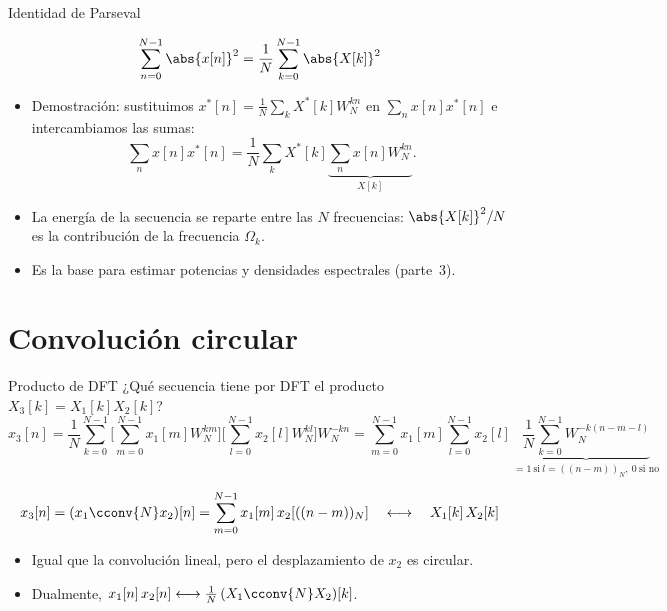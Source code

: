 \documentclass[aspectratio=169,11pt]{beamer}
\begin{document}
\begin{frame}{Identidad de Parseval}
  \begin{importante}
    \[
      \sum_{n=0}^{N-1}\abs{x[n]}^2=\frac{1}{N}\sum_{k=0}^{N-1}\abs{X[k]}^2
    \]
  \end{importante}
  \begin{itemize}
    \item Demostración: sustituimos $x^*[n]=\frac1N\sum_kX^*[k]W_N^{kn}$ en $\sum_nx[n]x^*[n]$ e intercambiamos las sumas:
    \[
      \sum_nx[n]x^*[n]=\frac1N\sum_kX^*[k]\underbrace{\sum_nx[n]W_N^{kn}}_{X[k]}.
    \]
    \item La energía de la secuencia se reparte entre las $N$ frecuencias: $\abs{X[k]}^2/N$ es la contribución de la frecuencia $\Omega_k$.
    \item Es la base para estimar potencias y densidades espectrales (parte~3).
  \end{itemize}
\end{frame}

\section{Convolución circular}

\begin{frame}{Producto de DFT}
  ¿Qué secuencia tiene por DFT el producto $X_3[k]=X_1[k]X_2[k]$?
  \[
    x_3[n]=\frac1N\sum_{k=0}^{N-1}\Big[\sum_{m=0}^{N-1}x_1[m]W_N^{km}\Big]\Big[\sum_{l=0}^{N-1}x_2[l]W_N^{kl}\Big]W_N^{-kn}
    =\sum_{m=0}^{N-1}x_1[m]\sum_{l=0}^{N-1}x_2[l]\,\underbrace{\frac1N\sum_{k=0}^{N-1}W_N^{-k(n-m-l)}}_{=1\ \text{si}\ l=((n-m))_N,\ 0\ \text{si no}}
  \]
  \begin{importante}
    \[
      x_3[n]=(x_1\cconv{N}x_2)[n]=\sum_{m=0}^{N-1}x_1[m]\,x_2[((n-m))_N]\quad\longleftrightarrow\quad X_1[k]\,X_2[k]
    \]
  \end{importante}
  \begin{itemize}\small
    \item Igual que la convolución lineal, pero el desplazamiento de $x_2$ es circular.
    \item Dualmente, $x_1[n]\,x_2[n]\longleftrightarrow\frac1N\,(X_1\cconv{N}X_2)[k]$.
  \end{itemize}
\end{frame}
\end{document}
